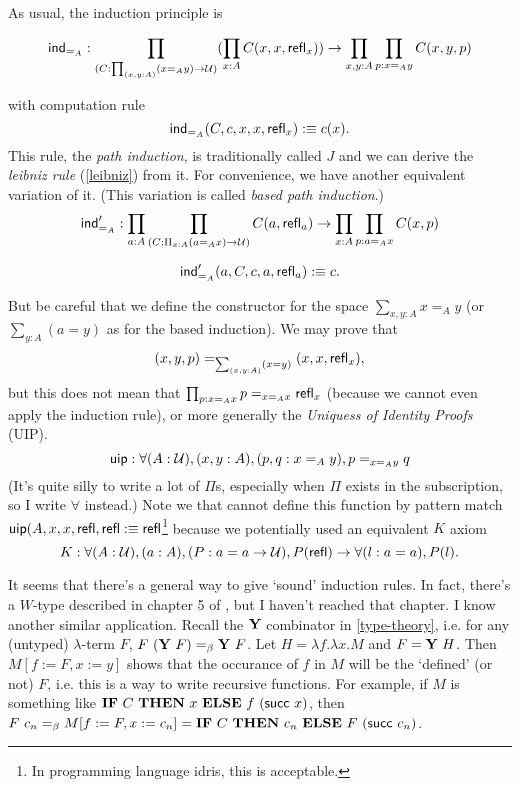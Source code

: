 As usual, the induction principle is

\begin{equation}
    \label{ind_id}
    \text{\sf ind}_{=_A}:\prod_{(C:\prod_{(x,y:A)}(x=_A y)\to\mathcal{U})}
    (\prod_{x:A}C(x,x,\text{\sf refl}_x))\to\prod_{x,y:A}\prod_{p:x=_A y}C(x,y,p)
\end{equation}

with computation rule
$$
    \text{\sf ind}_{=_A}(C,c,x,x,\text{\sf refl}_x):\equiv c(x).
$$
This rule, the {\it path induction}, is traditionally called $J$ and we 
can derive the {\it leibniz rule} (\autoref{leibniz}) from it. For 
convenience, we have another equivalent variation of it. (This variation 
is called {\it based path induction}.)
$$
    \text{\sf ind}'_{=_A}:\prod_{a:A}\prod_{(C:\Pi_{x:A}(a=_A x)\to \mathcal{U})}
    C(a, \text{\sf refl}_a) \to \prod_{x:A}\prod_{p:a=_A x}C(x, p)
$$

$$
    \text{\sf ind}'_{=_A}(a, C, c, a,\text{\sf refl}_a) :\equiv c.
$$

But be careful that we define the constructor for the space 
$\sum_{x,y:A}x=_A y$ (or $\sum_{y:A}(a=y)$ as for the based induction).
We may prove that $$(x,y,p)=_{\sum_{(x,y:A)}(x=y)}(x,x,\text{\sf refl}_x),$$ but
this does not mean that $\prod_{p:x=_A x}p=_{x=_Ax}\text{\sf refl}_x$ (because
we cannot even apply the induction rule), or more generally the {\it
Uniquess of Identity Proofs} (UIP).
\newcommand{\uip}{\name{uip}}
\begin{equation}
    \label{uip}
    \uip: \forall (A: \universe), (x,y:A), (p,q:x=_A y),p=_{x=_A y}q
\end{equation}
(It's quite silly to write a lot of $\Pi$s, especially when $\Pi$ exists
in the subscription, so I write $\forall$ instead.)
Note we that cannot define this function by pattern match 
$\uip(A,x,x,\refl,\refl\defn\refl$\footnote{In programming language
idris, this is acceptable.} because we potentially used an
equivalent $K$ axiom \cite{pattern-matching-without-K}
\begin{equation}
    \label{K-axiom}
    K: \forall (A:\mathcal{U}), (a:A), (P: a=a\to\mathcal{U}),
    P(\text{\sf refl})\to\forall (l: a = a), P(l).
\end{equation}

It seems that there's a general way to give `sound' induction rules.
In fact, there's a $W$-type described in chapter 5 of \cite{homotopy-type-theory},
but I haven't reached that chapter. I know another similar application.
Recall the $\mathbf{Y}$ combinator in \autoref{type-theory}, i.e. for any 
(untyped) $\lambda$-term $F$, $F\ (\mathbf{Y}\ F)=_\beta \mathbf{Y}\ F$.
Let $H=\lambda f.\lambda x.M$ and $F = \mathbf{Y}\ H$. Then
$M[f:=F,x:=y]$ shows that the occurance of $f$ in $M$ will be the `defined'
(or not) $F$, i.e. this is a way to write recursive functions.
For example, if $M$ is something like $\mathbf{IF}\ C\ \mathbf{THEN}\ x
\ \mathbf{ELSE}\ f\ (\succn\ x)$, then $F\ c_n=_\beta M[f:=F,x:=c_n]=
\mathbf{IF}\ C\ \mathbf{THEN}\ c_n\ \mathbf{ELSE}\ F\ (\succn\ c_n)$.

